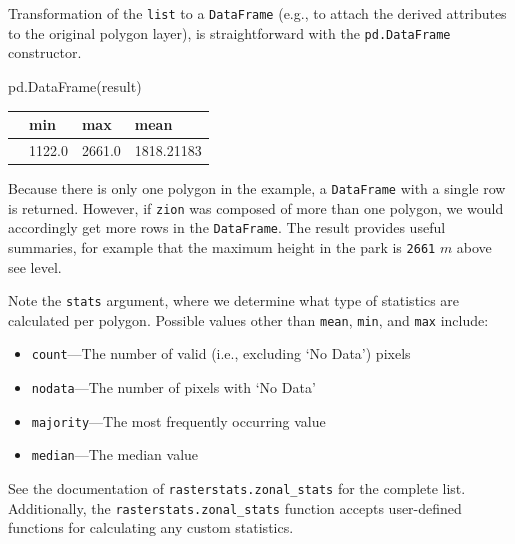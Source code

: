 \documentclass[
  letterpaper,
]{krantz}
\newenvironment{Shaded}{\begin{snugshade}}{\end{snugshade}}
\newcommand{\NormalTok}[1]{\textcolor[rgb]{0.00,0.23,0.31}{#1}}
\providecommand{\tightlist}{%
  \setlength{\itemsep}{0pt}\setlength{\parskip}{0pt}}\usepackage{longtable,booktabs,array}
\begin{document}
Transformation of the \texttt{list} to a \texttt{DataFrame} (e.g., to
attach the derived attributes to the original polygon layer), is
straightforward with the \texttt{pd.DataFrame} constructor.

\begin{Shaded}
\begin{Highlighting}[]
\NormalTok{pd.DataFrame(result)}
\end{Highlighting}
\end{Shaded}

\begin{longtable}[]{@{}llll@{}}
\toprule\noalign{}
& min & max & mean \\
\midrule\noalign{}
\endhead
\bottomrule\noalign{}
\endlastfoot
0 & 1122.0 & 2661.0 & 1818.21183 \\
\end{longtable}

Because there is only one polygon in the example, a \texttt{DataFrame}
with a single row is returned. However, if \texttt{zion} was composed of
more than one polygon, we would accordingly get more rows in the
\texttt{DataFrame}. The result provides useful summaries, for example
that the maximum height in the park is \texttt{2661} \(m\) above see
level.

Note the \texttt{stats} argument, where we determine what type of
statistics are calculated per polygon. Possible values other than
\texttt{\textquotesingle{}mean\textquotesingle{}},
\texttt{\textquotesingle{}min\textquotesingle{}}, and
\texttt{\textquotesingle{}max\textquotesingle{}} include:

\begin{itemize}
\tightlist
\item
  \texttt{\textquotesingle{}count\textquotesingle{}}---The number of
  valid (i.e., excluding `No Data') pixels
\item
  \texttt{\textquotesingle{}nodata\textquotesingle{}}---The number of
  pixels with `No Data'
\item
  \texttt{\textquotesingle{}majority\textquotesingle{}}---The most
  frequently occurring value
\item
  \texttt{\textquotesingle{}median\textquotesingle{}}---The median value
\end{itemize}

See the documentation of \texttt{rasterstats.zonal\_stats} for the
complete list. Additionally, the \texttt{rasterstats.zonal\_stats}
function accepts user-defined functions for calculating any custom
statistics.
\end{document}
